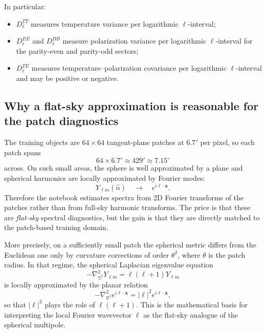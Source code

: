 \documentclass[11pt]{article}
\begin{document}
In particular:
\begin{itemize}[leftmargin=1.5em]
  \item \(D_\ell^{TT}\) measures temperature variance per logarithmic \(\ell\)-interval;
  \item \(D_\ell^{EE}\) and \(D_\ell^{BB}\) measure polarization variance per logarithmic \(\ell\)-interval for the parity-even and parity-odd sectors;
  \item \(D_\ell^{TE}\) measures temperature--polarization covariance per logarithmic \(\ell\)-interval and may be positive or negative.
\end{itemize}

\subsection{Why a flat-sky approximation is reasonable for the patch diagnostics}

The training objects are \(64\times 64\) tangent-plane patches at \(6.7'\) per pixel, so each patch spans
\begin{equation}
  64\times 6.7' \approx 429' \approx 7.15^\circ
\end{equation}
across. On such small areas, the sphere is well approximated by a plane and spherical harmonics are locally approximated by Fourier modes:
\begin{equation}
  Y_{\ell m}(\hat n)\quad \longrightarrow \quad e^{i\bm{\ell}\cdot \bm{x}}.
\end{equation}
Therefore the notebook estimates spectra from 2D Fourier transforms of the patches rather than from full-sky harmonic transforms. The price is that these are \emph{flat-sky} spectral diagnostics, but the gain is that they are directly matched to the patch-based training domain.

More precisely, on a sufficiently small patch the spherical metric differs from the Euclidean one only by curvature corrections of order \(\theta^2\), where \(\theta\) is the patch radius. In that regime, the spherical Laplacian eigenvalue equation
\begin{equation}
  -\nabla_{\mathbb S^2}^2 Y_{\ell m} = \ell(\ell+1)Y_{\ell m}
\end{equation}
is locally approximated by the planar relation
\begin{equation}
  -\nabla_{\mathbb R^2}^2 e^{i\bm{\ell}\cdot\bm{x}} = |\bm{\ell}|^2 e^{i\bm{\ell}\cdot\bm{x}},
\end{equation}
so that \(|\bm{\ell}|^2\) plays the role of \(\ell(\ell+1)\). This is the mathematical basis for interpreting the local Fourier wavevector \(\bm{\ell}\) as the flat-sky analogue of the spherical multipole.
\end{document}
